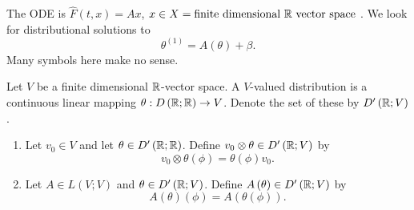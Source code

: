 The ODE is $\hat{F} \left( t, x \right)  = Ax$, $x \in  X = \text{finite dimensional }\mathbb{R} \text{ vector space }$. 
We look for distributional solutions to 
\[
	\theta ^{\left( 1 \right) } = A\left( \theta \right) + \beta
.\] 
Many symbols here make no sense. 
\begin{definition}
	Let $V$ be a finite dimensional $\mathbb{R}$-vector space. A $ V$-valued distribution is a continuous linear mapping $\theta : D\left( \mathbb{R}; \mathbb{R} \right)  \to V$. Denote the set of these by $D'\left( \mathbb{R}; V \right) $. 
\end{definition}

\begin{eg}
	\begin{enumerate}
		\item Let $v_0 \in  V$ and let $\theta \in  D'\left( \mathbb{R}; \mathbb{R} \right) $. Define $v_0 \otimes \theta \in  D'\left( \mathbb{R}; V \right) $ by 
			 \[
				 v_0 \otimes \theta \left( \phi \right) = \theta \left( \phi \right) v_0
			.\] 
		\item Let $A \in L \left( V; V \right) $ and $\theta \in  D'\left( \mathbb{R}; V \right) $. Define $A\left( \theta \right) \in  D'\left( \mathbb{R}; V\right) $ by 
			\[
				A\left( \theta  \right) \left( \phi \right)  = A\left( \theta\left( \phi \right)  \right) 
			.\] 
	\end{enumerate}
\end{eg}
